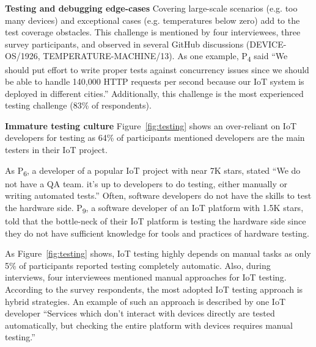 \textbf{Testing and debugging edge-cases}
Covering large-scale scenarios (e.g. too many devices) and exceptional cases (e.g. temperatures below zero) add to the test coverage obstacles. This challenge is mentioned by four interviewees, three survey participants, and observed in several GitHub discussions (DEVICE-OS/1926, TEMPERATURE-MACHINE/13). As one example, P\textsubscript{4} said \enquote{We should put effort to write proper tests against concurrency issues since we should be able to handle 140,000 HTTP requests per second because our IoT system is deployed in different cities.} Additionally, this challenge is the most experienced testing challenge (83\% of respondents). 

\textbf{Immature testing culture}
Figure~\ref{fig:testing} shows an over-reliant on IoT developers for testing as 64\% of participants mentioned developers are the main testers in their IoT project.


As P\textsubscript{6}, a developer of a popular IoT project with near 7K stars, stated \enquote{We do not have a QA team. it's up to developers to do testing, either manually or writing automated tests.} Often, software developers do not have the skills to test the hardware side. P\textsubscript{9}, a software developer of an IoT platform with 1.5K stars, told that the bottle-neck of their IoT platform is testing the hardware side since they do not have sufficient knowledge for tools and practices of hardware testing.


As Figure~\ref{fig:testing} shows, IoT testing highly depends on manual tasks as only 5\% of participants reported testing completely automatic. Also, during interviews, four interviewees mentioned manual approaches for IoT testing. According to the survey respondents, the most adopted IoT testing approach is hybrid strategies. An example of such an approach is described by one IoT developer \enquote{Services which don't interact with devices directly are tested automatically, but checking the entire platform with devices requires manual testing.} 


